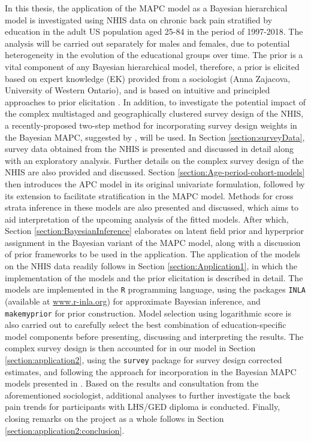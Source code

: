 In this thesis, the application of the MAPC model as a Bayesian hierarchical model is investigated using NHIS data on chronic back pain stratified by education in the adult US population aged 25-84 in the period of 1997-2018. The analysis will be carried out separately for males and females, due to potential heterogeneity in the evolution of the educational groups over time. The prior is a vital component of any Bayesian hierarchical model, therefore, a prior is elicited based on expert knowledge (EK) provided from a sociologist (Anna Zajacova, University of Western Ontario), and is based on intuitive and principled approaches to prior elicitation \citep{PC-priors,Jointprior}. In addition, to investigate the potential impact of the complex multistaged and geographically clustered survey design of the NHIS, a recently-proposed two-step method for incorporating survey design weights in the Bayesian MAPC, suggested by \cite{SurveyDesignMercer}, will be used. In Section \ref{section:surveyData}, survey data obtained from the NHIS is presented and discussed in detail along with an exploratory analysis. Further details on the complex survey design of the NHIS are also provided and discussed. Section \ref{section:Age-period-cohort-models} then introduces the APC model in its original univariate formulation, followed by its extension to facilitate stratification in the MAPC model. Methods for cross strata inference in these models are also presented and discussed, which aims to aid interpretation of the upcoming analysis of the fitted models. After which, Section \ref{section:BayesianInference} elaborates on latent field prior and hyperprior assignment in the Bayesian variant of the MAPC model, along with a discussion of prior frameworks to be used in the application. The application of the models on the NHIS data readily follows in Section \ref{section:Application1}, in which the implementation of the models and the prior elicitation is described in detail. The models are implemented in the \texttt{R} programming language, using the packages \texttt{INLA} (available at \href{www.r-inla.org}{www.r-inla.org}) for approximate Bayesian inference, and \texttt{makemyprior} \citep{MMPPackage, MMP} for prior construction. Model selection using logarithmic score \citep{proper-scoring} is also carried out to carefully select the best combination of education-specific model components before presenting, discussing and interpreting the results. The complex survey design is then accounted for in our model in Section \ref{section:application2}, using the \texttt{survey} package for survey design corrected estimates, and following the approach for incorporation in the Bayesian MAPC models presented in \cite{SurveyDesignMercer}. Based on the results and consultation from the aforementioned sociologist, additional analyses to further investigate the back pain trends for participants with LHS/GED diploma is conducted. Finally, closing remarks on the project as a whole follows in Section \ref{section:application2:conclusion}.

